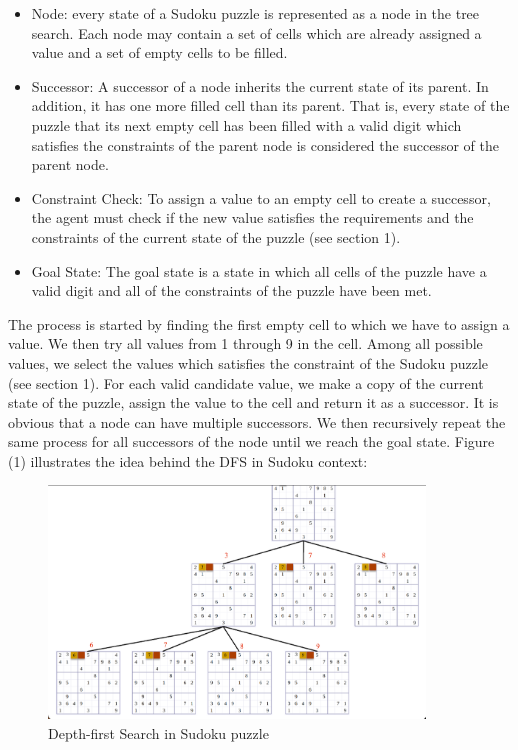 \begin{itemize}
\item Node: every state of a Sudoku puzzle is represented as a node in the tree search. Each node may contain a set of cells which are already assigned a value and a set of empty cells to be filled.

\item Successor: A successor of a node inherits the current state of its parent. In addition, it has one more filled cell than its parent. That is, every state of the puzzle that its next empty cell has been filled with a valid digit which satisfies the constraints of the parent node is considered the successor of the parent node.

\item Constraint Check: To assign a value to an empty cell to create a successor, the agent must check if the new value satisfies the requirements and the constraints of the current state of the puzzle (see section 1). 

\item Goal State: The goal state is a state in which all cells of the puzzle have a valid digit and all of the constraints of the puzzle have been met.  \\

\end{itemize}

The process is started by finding the first empty cell to which we have to assign a value. We then try all values from 1 through 9 in the cell. Among all possible values, we select the values which satisfies the constraint of the Sudoku puzzle (see section 1). For each valid candidate value, we make a copy of the current state of the puzzle, assign the value to the cell and return it as a successor. It is obvious that a node can have multiple successors. We then recursively repeat the same process for all successors of the node until we reach the goal state.  Figure (1) illustrates the idea behind the DFS in Sudoku context: 

\begin{figure} [htbp]
\centering
\includegraphics[width=100mm,scale=2]{figures/DFS.png}
\caption{Depth-first Search in Sudoku puzzle}
\label{fig:access_points}
\end{figure}


